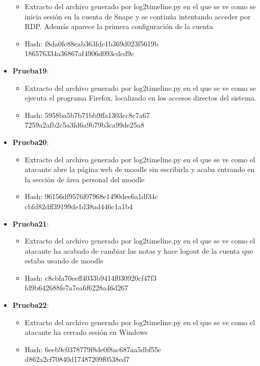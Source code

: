 \begin{itemize}
{    \begin{itemize}
      \item{Extracto del archivo generado por log2timeline.py en el que se ve como se inicia sesión en la cuenta de Snape y se continúa intentando acceder por \gls{RDP}. Además aparece la primera configuración de la cuenta}
      \item{Hash}: f8da0fc88eab363fdc1b369d023f5619b\\186576334a36867af4906d093cdcd9c
    \end{itemize}}
  \item{\textbf{Prueba19}: 
    \begin{itemize}
      \item{Extracto del archivo generado por log2timeline.py en el que se ve como se ejecuta el programa Firefox, localizado en los accesos directos del sistema.}
      \item{Hash}: 5958ba5b7b71bb9ffa1303cc8c7a67\\7259a2afb2c5a3fd6a9b79b3ca99de25a8
    \end{itemize}}
  \item{\textbf{Prueba20}: 
    \begin{itemize}
      \item{Extracto del archivo generado por log2timeline.py en el que se ve como el atacante abre la página web de moodle sin escribirla y acaba entrando en la sección de área personal del moodle}
      \item{Hash}: 96156df9576f07968e1490dee6a1df34c\\cbfd82dff39199de1d38ad446c1a1b4
    \end{itemize}}
  \item{\textbf{Prueba21}: 
    \begin{itemize}
      \item{Extracto del archivo generado por log2timeline.py en el que se ve como el atacante ha acabado de cambiar las notas y hace logout de la cuenta que estaba usando de moodle}
      \item{Hash}: c8cbfa70eeff4033b9414f030920cf47f3\\fd9b642688fe7a7ea6f6228a46d267
    \end{itemize}}
  \item{\textbf{Prueba22}: 
    \begin{itemize}
      \item{Extracto del archivo generado por log2timeline.py en el que se ve como el atacante ha cerrado sesión en Windows}
      \item{Hash}: 6eeb9c0378779f8de0f8ac687aa5dbf55c\\d862a2cf70840d17487209f0538ed7

\end{itemize}}
\end{itemize}
